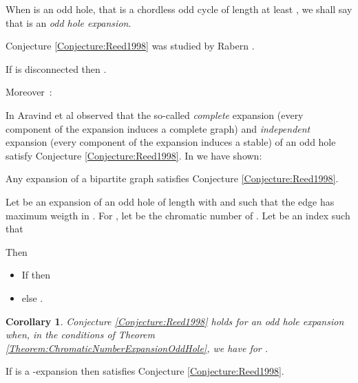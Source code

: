 \documentclass{amsart}
\newtheorem{cor}[thm]{Corollary}
\theoremstyle{definition}
\theoremstyle{remark}
\begin{document}
 When  is an odd hole, that is a chordless odd cycle of length at least , we shall say that  is an {\em odd hole expansion}.




Conjecture \ref{Conjecture:Reed1998} was  studied by Rabern \cite{Rab2008}.

\begin{thm}\cite{Rab2008} \label{Theorem:Complement}If  is disconnected then
.
\end{thm}

 Moreover~:



In \cite{AraKarSub2011} Aravind et al observed that the so-called {\em complete} expansion (every component of the expansion induces a complete graph) and {\em independent} expansion 
(every component of the expansion induces a stable) of an odd hole satisfy  Conjecture \ref{Conjecture:Reed1998}.
In \cite{FouVan2011} we have shown:

\begin{thm} \cite{FouVan2011} \label{Theorem:ReedsForBipartiteExpansion}
Any expansion of a bipartite graph satisfies  Conjecture \ref{Conjecture:Reed1998}.
\end{thm}


\begin{thm}\cite{FouVan2011} \label{Theorem:ChromaticNumberExpansionOddHole}
Let  be an expansion of an odd hole  of length  with and such that the edge  has maximum weigth in . For , 
let  be the chromatic number of .
Let  be an index such that


Then
\begin{itemize}
 \item If  then 
 \item else .
\end{itemize}
\end{thm}

\begin{cor}\cite{FouVan2011} \label{Corollary:ReedsConjecturePourSpecialOddHole}
 Conjecture \ref{Conjecture:Reed1998} holds for an odd hole expansion when,
 in the conditions of Theorem \ref{Theorem:ChromaticNumberExpansionOddHole}, we have  for .
\end{cor}

\begin{thm} \cite{FouVan2011} \label{Theorem:C5_Expansion} If  is a -expansion then  satisfies  Conjecture \ref{Conjecture:Reed1998}.
\end{thm}
\end{document}
